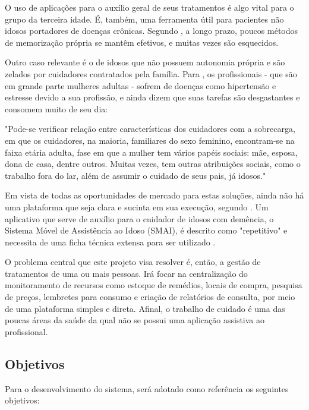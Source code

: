 \documentclass[
	article,			%
	12pt,				%
	oneside,			%
	a4paper,			%
    BIBLATEX,           %
	english,			%
	brazil,				%
	sumario=tradicional
	]{abntex2}
\begin{document}
O uso de aplicações para o auxílio geral de seus tratamentos é algo vital para o grupo da terceira idade. É, também, uma ferramenta útil para pacientes não idosos portadores de doenças crônicas. Segundo , a longo prazo, poucos métodos de memorização própria se mantêm efetivos, e muitas vezes são esquecidos.

Outro caso relevante é o de idosos que não possuem autonomia própria e são zelados por cuidadores contratados pela família. Para , os profissionais - que são em grande parte mulheres adultas - sofrem de doenças como hipertensão e estresse devido a sua profissão, e ainda dizem que suas tarefas são desgastantes e consomem muito de seu dia:

\begin{citacao}
"Pode-se verificar relação entre características dos cuidadores com a sobrecarga, em que os cuidadores, na maioria, familiares do sexo feminino, encontram-se na faixa etária adulta, fase em que a mulher tem vários papéis sociais: mãe, esposa, dona de casa, dentre outros. Muitas vezes, tem outras atribuições sociais, como o trabalho fora do lar, além de assumir o cuidado de seus pais, já idosos." \cite{aline2012sobrecarga} 
\end{citacao}

Em vista de todas as oportunidades de mercado para estas soluções, ainda não há uma plataforma que seja clara e sucinta em sua execução, segundo . Um aplicativo que serve de auxílio para o cuidador de idosos com demência, o Sistema Móvel de Assistência ao Idoso (SMAI), é descrito como "repetitivo" e necessita de uma ficha técnica extensa para ser utilizado \cite{andre2020}.

O problema central que este projeto visa resolver é, então, a gestão de tratamentos de uma ou mais pessoas. Irá focar na centralização do monitoramento de recursos como estoque de remédios, locais de compra, pesquisa de preços, lembretes para consumo e criação de relatórios de consulta, por meio de uma plataforma simples e direta. Afinal, o trabalho de cuidado é uma das poucas áreas da saúde da qual não se possui uma aplicação assistiva ao profissional.

\subsection{Objetivos}

Para o desenvolvimento do sistema, será adotado como referência os seguintes objetivos:
\end{document}
